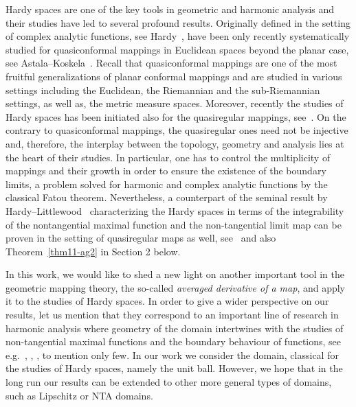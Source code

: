 \documentclass[11pt,a4paper,reqno]{amsart}
\theoremstyle{definition}
\numberwithin{komcounter}{section}
\begin{document}
Hardy spaces are one of the key tools in geometric and harmonic analysis and their studies have led to several profound  
results. Originally defined in the setting of complex analytic functions, see Hardy~\cite{ha}, have been only recently systematically studied for quasiconformal mappings in Euclidean spaces beyond the planar case, see Astala--Koskela~\cite{ak}. Recall that quasiconformal mappings are one of the most fruitful generalizations of planar conformal mappings and are studied in various settings including the Euclidean, the Riemannian and the sub-Riemannian settings, as well as, the metric measure spaces. Moreover, recently the studies of Hardy spaces has been initiated also for the quasiregular mappings, see~\cite{ag1, ag2}. On the contrary to quasiconformal mappings, the quasiregular ones need not be injective and, therefore, the interplay between the topology, geometry and analysis lies at the heart of their studies. In particular, one has to control the multiplicity of mappings and their growth in order to ensure the existence of the boundary limits, a problem solved for harmonic and complex analytic functions by the classical Fatou theorem. Nevertheless, a counterpart of the seminal result by Hardy--Littlewood~\cite{hl} characterizing the Hardy spaces in terms of the integrability of the nontangential maximal function and the non-tangential limit map can be proven in the setting of quasiregular maps as well, see~\cite{ag2} and also Theorem~\ref{thm11-ag2} in Section 2 below. 

In this work, we would like to shed a new light on another important tool in the geometric mapping theory, the so-called \emph{averaged derivative of a map}, and apply it to the studies of Hardy spaces. In order to give a wider perspective on our results, let us mention that they correspond to an important line of research in harmonic analysis where geometry of the domain intertwines with the studies of non-tangential maximal functions and the boundary behaviour of functions, see e.g.~\cite{gmt}, \cite{hmm}, \cite{hmmtz}, \cite{ht} to mention only few. In our work we consider the domain, classical for the studies of Hardy spaces, namely the unit ball. However, we hope that in the long run our results can be extended to other more general types of domains, such as Lipschitz or NTA domains.
\end{document}
